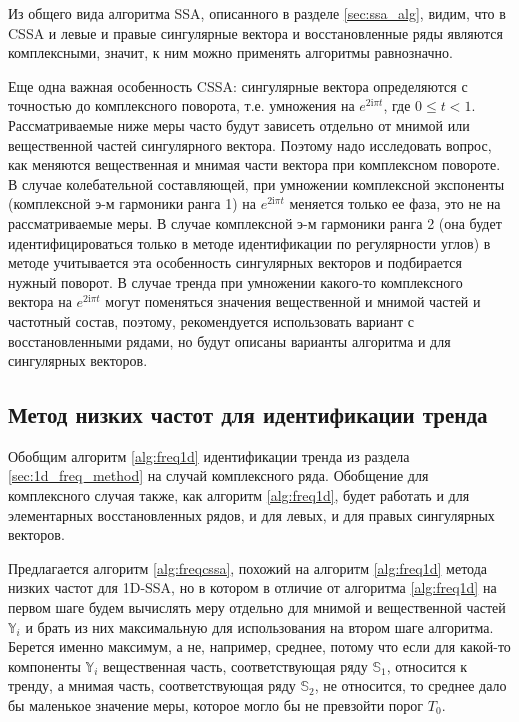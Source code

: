 \documentclass[specialist,
               substylefile = spbu.rtx,
               subf,href,colorlinks=true, 12pt]{disser}
\newcommand{\I}{\mathrm{i}}
\begin{document}
Из общего вида алгоритма SSA, описанного в разделе \ref{sec:ssa_alg}, видим, что в CSSA и левые и правые сингулярные вектора и восстановленные ряды являются комплексными, значит, к ним можно применять алгоритмы равнозначно.

Еще одна важная особенность CSSA: сингулярные вектора определяются с точностью до комплексного поворота, т.е. умножения на $e^{2\I\pi t}$, где $0 \leqslant t<1$. 
Рассматриваемые ниже меры часто будут зависеть отдельно от мнимой или вещественной частей сингулярного вектора.
Поэтому надо исследовать вопрос, как меняются вещественная и мнимая части вектора при комплексном повороте.
В случае колебательной составляющей, при умножении комплексной экспоненты (комплексной э-м гармоники ранга 1) на $e^{2\I\pi t}$ меняется только ее фаза, это не на рассматриваемые меры.
В случае комплексной э-м гармоники ранга 2 (она будет идентифицироваться только в методе идентификации по регулярности углов) в методе учитывается эта особенность сингулярных векторов и подбирается нужный поворот. 
В случае тренда 
при умножении какого-то комплексного вектора на  $e^{2\I\pi t}$ могут поменяться значения вещественной и мнимой частей и частотный состав, поэтому, рекомендуется использовать вариант с восстановленными рядами, но будут описаны варианты алгоритма и для сингулярных векторов.


\subsection{Метод низких частот для идентификации тренда}
\label{sec:freq_method_cssa}
Обобщим алгоритм \ref{alg:freq1d} идентификации тренда из раздела \ref{sec:1d_freq_method} на случай комплексного ряда. 
Обобщение для комплексного случая также, как алгоритм \ref{alg:freq1d}, будет работать и для элементарных восстановленных рядов, и для левых, и для правых сингулярных векторов.

Предлагается алгоритм \ref{alg:freqcssa}, похожий на алгоритм \ref{alg:freq1d} метода низких частот  для 1D-SSA, но в котором в отличие от алгоритма \ref{alg:freq1d} на первом шаге будем вычислять меру отдельно для мнимой и вещественной частей $\mathbb{Y}_i$ и брать из них максимальную для использования на втором шаге алгоритма. 
Берется именно максимум, а не, например, среднее, потому что если для какой-то компоненты $\mathbb{Y}_i$ вещественная часть, соответствующая ряду $\mathbb{S}_1$, относится к тренду, а мнимая часть, соответствующая ряду $\mathbb{S}_2$, не относится, то среднее дало бы маленькое значение меры, которое могло бы не превзойти порог $T_0$.
\end{document}
